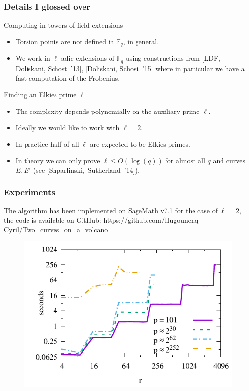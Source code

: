 \documentclass[10pt]{beamer}
\theoremstyle{plain}
\theoremstyle{definition}
\theoremstyle{definition}
\theoremstyle{definition}
\theoremstyle{definition}
\theoremstyle{remark}
\theoremstyle{remark}
\newcommand{\orangebox}[2]{\begin{block}{#1}#2\end{block}}
\def\F{\mathbb{F}}
\begin{document}
\begin{frame}
  \frametitle{Details I glossed over}

  \orangebox{Computing in towers of field extensions}{
    \begin{itemize}
    \item Torsion points are not defined in $\F_q$, in general.	
    \item We work in $\ell$-adic extensions of $\mathbb F_q$
      using constructions from [LDF, Doliskani, Schost~'13], [Doliskani, Schost~'15] where in particular we have a fast computation of the Frobenius.
    \end{itemize}
  }

  \orangebox{Finding an Elkies prime $\ell$}{
    \begin{itemize}
    \item The complexity depends polynomially on the auxiliary prime $\ell$.
    \item Ideally we would like to work with $\ell=2$.
    \item In practice half of all $\ell$ are expected to be Elkies primes.
    \item In theory we can only prove $\ell \leq O(\log(q))$ for almost
      all $q$ and curves $E,E'$ (see [Shparlinski,~Sutherland~'14]).
    \end{itemize}
  }
\end{frame}



\begin{frame}
  \frametitle{Experiments}
  The algorithm has been implemented on SageMath v7.1 for the case of $\ell=2$, the code is available on GitHub: \url{https://github.com/Hugounenq-Cyril/Two_curves_on_a_volcano}
  \begin{figure}[hbtp]
    \centering
    \includegraphics[scale=0.8]{Images/graphe-101-149-269.pdf}
  \end{figure}
\end{frame}
\end{document}
